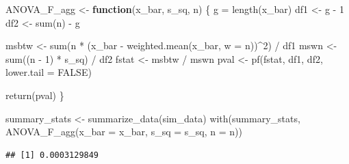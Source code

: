\documentclass[
]{book}
\newenvironment{Shaded}{\begin{snugshade}}{\end{snugshade}}
\newcommand{\AttributeTok}[1]{\textcolor[rgb]{0.77,0.63,0.00}{#1}}
\newcommand{\ConstantTok}[1]{\textcolor[rgb]{0.00,0.00,0.00}{#1}}
\newcommand{\ControlFlowTok}[1]{\textcolor[rgb]{0.13,0.29,0.53}{\textbf{#1}}}
\newcommand{\DecValTok}[1]{\textcolor[rgb]{0.00,0.00,0.81}{#1}}
\newcommand{\FunctionTok}[1]{\textcolor[rgb]{0.00,0.00,0.00}{#1}}
\newcommand{\NormalTok}[1]{#1}
\newcommand{\OtherTok}[1]{\textcolor[rgb]{0.56,0.35,0.01}{#1}}
\newcommand{\SpecialCharTok}[1]{\textcolor[rgb]{0.00,0.00,0.00}{#1}}
\begin{document}
\begin{Shaded}
\begin{Highlighting}[]
\NormalTok{ANOVA\_F\_agg }\OtherTok{\textless{}{-}} \ControlFlowTok{function}\NormalTok{(x\_bar, s\_sq, n) \{}
\NormalTok{  g }\OtherTok{=} \FunctionTok{length}\NormalTok{(x\_bar)}
\NormalTok{  df1 }\OtherTok{\textless{}{-}}\NormalTok{ g }\SpecialCharTok{{-}} \DecValTok{1}
\NormalTok{  df2 }\OtherTok{\textless{}{-}} \FunctionTok{sum}\NormalTok{(n) }\SpecialCharTok{{-}}\NormalTok{ g}
  
\NormalTok{  msbtw }\OtherTok{\textless{}{-}} \FunctionTok{sum}\NormalTok{(n }\SpecialCharTok{*}\NormalTok{ (x\_bar }\SpecialCharTok{{-}} \FunctionTok{weighted.mean}\NormalTok{(x\_bar, }\AttributeTok{w =}\NormalTok{ n))}\SpecialCharTok{\^{}}\DecValTok{2}\NormalTok{) }\SpecialCharTok{/}\NormalTok{ df1}
\NormalTok{  mswn }\OtherTok{\textless{}{-}} \FunctionTok{sum}\NormalTok{((n }\SpecialCharTok{{-}} \DecValTok{1}\NormalTok{) }\SpecialCharTok{*}\NormalTok{ s\_sq) }\SpecialCharTok{/}\NormalTok{ df2}
\NormalTok{  fstat }\OtherTok{\textless{}{-}}\NormalTok{ msbtw }\SpecialCharTok{/}\NormalTok{ mswn}
\NormalTok{  pval }\OtherTok{\textless{}{-}} \FunctionTok{pf}\NormalTok{(fstat, df1, df2, }\AttributeTok{lower.tail =} \ConstantTok{FALSE}\NormalTok{)}
 
  \FunctionTok{return}\NormalTok{(pval)}
\NormalTok{\}}

\NormalTok{summary\_stats }\OtherTok{\textless{}{-}} \FunctionTok{summarize\_data}\NormalTok{(sim\_data)}
\FunctionTok{with}\NormalTok{(summary\_stats, }\FunctionTok{ANOVA\_F\_agg}\NormalTok{(}\AttributeTok{x\_bar =}\NormalTok{ x\_bar, }\AttributeTok{s\_sq =}\NormalTok{ s\_sq, }\AttributeTok{n =}\NormalTok{ n))}
\end{Highlighting}
\end{Shaded}

\begin{verbatim}
## [1] 0.0003129849
\end{verbatim}
\end{document}
